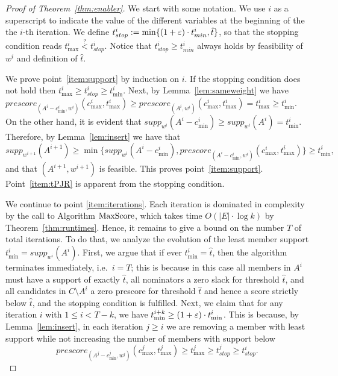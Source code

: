 \begin{proof}[Proof of Theorem~\ref{thm:enabler}]
We start with some notation. We use $i$ as a superscript to indicate the value of the different variables at the beginning of the the $i$-th iteration. We define $t^i_{stop}:=\min\{(1+\varepsilon)\cdot t^i_{min}, \hat{t}\}$, so that the stopping condition reads $t^i_{\max} \stackrel{?}{<} t^i_{stop}$. Notice that $t^i_{stop}\geq t^i_{min}$ always holds by feasibility of $w^i$ and definition of $\hat{t}$. 

We prove point~\ref{item:support} by induction on $i$. 
If the stopping condition does not hold then $t^i_{\max} \geq t^i_{stop}\geq t^i_{\min}$. 
Next, by Lemma~\ref{lem:sameweight} we have $prescore_{(A^i-c_{\min}^i, w^i)}(c^i_{\max}, t^i_{\max}) \geq prescore_{(A^i, w^i)}(c^i_{\max}, t^i_{\max})=t^i_{\max}\geq t^i_{\min}$. 
On the other hand, it is evident that $supp_{w^i}(A^i-c^i_{\min})\geq supp_{w^i}(A^i)=t^i_{\min}$. 
Therefore, by Lemma~\ref{lem:insert} we have that  
$$supp_{w^{i+1}}(A^{i+1})\geq \min\{supp_{w^i}(A^i-c^i_{\min}), prescore_{(A^i-c_{\min}^i, w^i)}(c^i_{\max}, t^i_{\max})\} \geq t^i_{\min},$$
and that $(A^{i+1},w^{i+1})$ is feasible.  
This proves point~\ref{item:support}. Point~\ref{item:tPJR} is apparent from the stopping condition. 

We continue to point \ref{item:iterations}. Each iteration is dominated in complexity by the call to Algorithm $\operatorname{MaxScore}$, which takes time $O(|E|\cdot \log k)$ by Theorem~\ref{thm:runtimes}. 
Hence, it remains to give a bound on the number $T$ of total iterations. 
To do that, we analyze the evolution of the least member support $t^i_{\min}=supp_{w^i}(A^i)$. First, we argue that if ever $t^i_{\min}=\hat{t}$, then the algorithm terminates immediately, i.e.~$i=T$; this is because in this case all members in $A^i$ must have a support of exactly $\hat{t}$, all nominators a zero slack for threshold $\hat{t}$, and all candidates in $C\setminus A^i$ a zero prescore for threshold $\hat{t}$ and hence a score strictly below $\hat{t}$, and the stopping condition is fulfilled.
Next, we claim that for any iteration $i$ with $1\leq i<T-k$, we have $t^{i+k}_{\min}\geq (1+\varepsilon)\cdot t^{i}_{\min}$. This is because, by Lemma~\ref{lem:insert}, in each iteration $j\geq i$ we are removing a member with least support while not increasing the number of members with support below 
$$prescore_{(A^j - c^j_{\min}, w^j)}(c^j_{\max}, t^j_{\max})\geq t^j_{\max}\geq t^j_{stop}\geq t^i_{stop}.$$
 

\end{proof}
